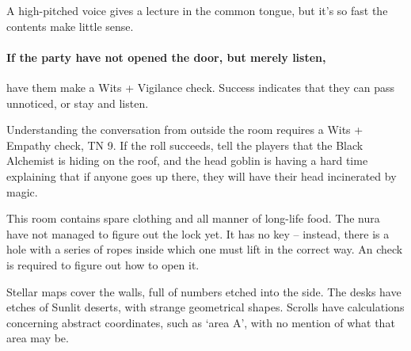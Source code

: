 \begin{multicols}{2}



\begin{boxtext}

  A high-pitched voice gives a lecture in the common tongue, but it's so fast the contents make little sense.

\end{boxtext}

\paragraph{If the party have not opened the door, but merely listen,}
have them make a Wits + Vigilance check.
Success indicates that they can pass unnoticed, or stay and listen.

Understanding the conversation from outside the room requires a Wits + Empathy check, TN 9.
If the roll succeeds, tell the players that the Black Alchemist is hiding on the roof, and the head goblin is having a hard time explaining that if anyone goes up there, they will have their head incinerated by magic.

\goblinnuramancer



This room contains spare clothing and all manner of long-life food.
The nura have not managed to figure out the lock yet.
It has no key -- instead, there is a hole with a series of ropes inside which one must lift in the correct way.
An  check \tn[10] is required to figure out how to open it.


\begin{boxtext}

  Stellar maps cover the walls, full of numbers etched into the side.
  The desks have etches of Sunlit deserts, with strange geometrical shapes.
  Scrolls have calculations concerning abstract coordinates, such as `area A', with no mention of what that area may be.

\end{boxtext}



\end{multicols}
